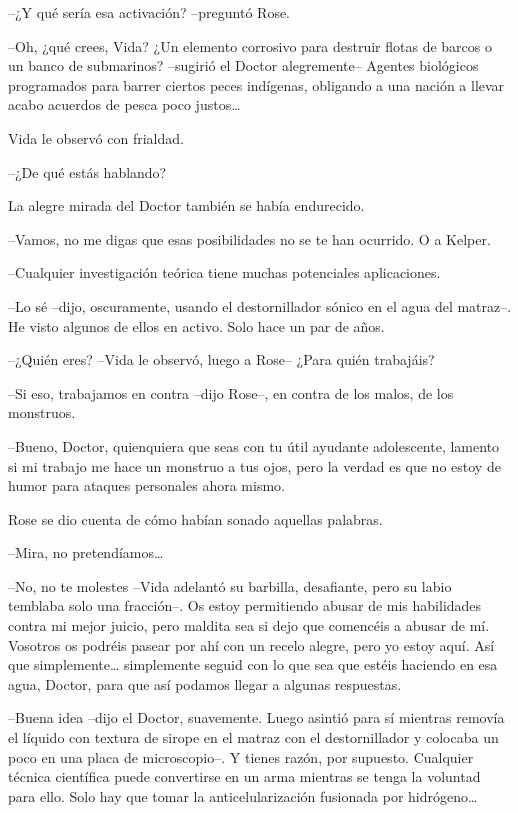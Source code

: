 {--¿Y qué sería esa activación? --preguntó Rose.}

{--Oh, ¿qué crees, Vida? ¿Un elemento corrosivo para destruir flotas de
 barcos o un banco de submarinos? --sugirió el Doctor alegremente--
 Agentes biológicos programados para barrer ciertos peces indígenas,
 obligando a una nación a llevar acabo acuerdos de pesca poco
 justos\ldots{}}

{Vida le observó con frialdad.}

{--¿De qué estás hablando?}

{La alegre mirada del Doctor también se había endurecido.}

{--Vamos, no me digas que esas posibilidades no se te han ocurrido. O a
Kelper.}

{--Cualquier investigación teórica tiene muchas potenciales
aplicaciones.}

{--Lo sé --dijo, oscuramente, usando el destornillador sónico en el agua
 del matraz--. He visto algunos de ellos en activo. Solo hace un par de
años.}

{--¿Quién eres? --Vida le observó, luego a Rose-- ¿Para quién
trabajáis?}

{--Si eso, trabajamos en contra --dijo Rose--, en contra de los malos,
de los monstruos.}

{--Bueno, Doctor, quienquiera que seas con tu útil ayudante adolescente,
 lamento si mi trabajo me hace un monstruo a tus ojos, pero la verdad es
que no estoy de humor para ataques personales ahora mismo.}

{Rose se dio cuenta de cómo habían sonado aquellas palabras.}

{--Mira, no pretendíamos\ldots{}}

{--No, no te molestes --Vida adelantó su barbilla, desafiante, pero su
 labio temblaba solo una fracción--. Os estoy permitiendo abusar de mis
 habilidades contra mi mejor juicio, pero maldita sea si dejo que
 comencéis a abusar de mí. Vosotros os podréis pasear por ahí con un
 recelo alegre, pero yo estoy aquí. Así que simplemente\ldots{}
 simplemente seguid con lo que sea que estéis haciendo en esa agua,
Doctor, para que así podamos llegar a algunas respuestas.}

{--Buena idea --dijo el Doctor, suavemente. Luego asintió para sí
 mientras removía el líquido con textura de sirope en el matraz con el
 destornillador y colocaba un poco en una placa de microscopio--. Y
 tienes razón, por supuesto. Cualquier técnica científica puede
 convertirse en un arma mientras se tenga la voluntad para ello. Solo hay
 que tomar la anticelularización fusionada por hidrógeno\ldots{}}

